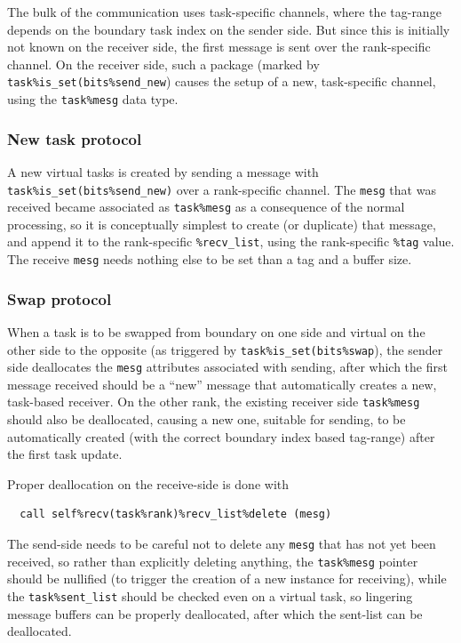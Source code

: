\documentclass[paper=a4,fontsize=11pt]{scrartcl}
\numberwithin{equation}{section}		%
\numberwithin{figure}{section}			%
\numberwithin{table}{section}				%
\newcommand{\codecolor}{\color{Blue}}
\newcommand{\Code}[1]{{\codecolor\texttt{#1}}}
\begin{document}
The bulk of the communication uses task-specific channels, where the tag-range depends on the boundary task index on the sender side.  But since this is initially not known on the receiver side, the first message is sent over the rank-specific channel.  On the receiver side, such a package (marked by \Code{task\%is\_set(bits\%send\_new}) causes the setup of a new, task-specific channel, using the \Code{task\%mesg} data type.

\subsubsection{New task protocol}
A new virtual tasks is created by sending a message with \Code{task\%is\_set(bits\%send\_new)} over a rank-specific channel. The \Code{mesg} that was received became associated as \Code{task\%mesg} as a consequence of the normal processing, so it is conceptually simplest to create (or duplicate) that message, and append it to the rank-specific \Code{\%recv\_list}, using the rank-specific \Code{\%tag} value.  The receive \Code{mesg} needs nothing else to be set than a tag and a buffer size.

\subsubsection{Swap protocol}
When a task is to be swapped from boundary on one side and virtual on the other side to the opposite (as triggered by \Code{task\%is\_set(bits\%swap}), the sender side deallocates the \Code{mesg} attributes associated with sending, after which the first message received should be a ``new'' message that automatically creates a new, task-based receiver.  On the other rank, the existing receiver side \Code{task\%mesg} should also be deallocated, causing a new one, suitable for sending, to be automatically created (with the correct boundary index based tag-range) after the first task update.

Proper deallocation on the receive-side is done with
{\codecolor\begin{verbatim}
  call self%recv(task%rank)%recv_list%delete (mesg)
\end{verbatim}}
The send-side needs to be careful not to delete any \Code{mesg} that has not yet been received, so rather than explicitly deleting anything, the \Code{task\%mesg} pointer should be nullified (to trigger the creation of a new instance for receiving), while the \Code{task\%sent\_list} should be checked even on a virtual task, so lingering message buffers can be properly deallocated, after which the sent-list can be deallocated.
\end{document}

